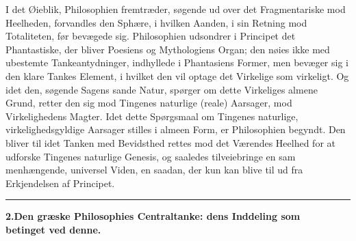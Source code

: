 \documentclass[12pt,a4paper]{book}
\newcommand{\divrule}{\begin{center}\rule{2cm}{0.4pt}\end{center}}
\newcommand{\dblrule}{\begin{center}%
  \rule{2cm}{0.4pt}\\[1.2pt]\rule{2cm}{0.4pt}\end{center}}
\begin{document}
I det Øieblik, Philosophien fremtræder, søgende ud over
det Fragmentariske mod Heelheden, forvandles den Sphære, i
hvilken Aanden, i sin Retning mod Totaliteten, før bevægede
sig. Philosophien udsondrer i Principet det Phantastiske, der
bliver Poesiens og Mythologiens Organ; den nøies ikke med
ubestemte Tankeantydninger, indhyllede i Phantasiens Former,
men bevæger sig i den klare Tankes Element, i hvilket den
vil optage det Virkelige som virkeligt. Og idet den, søgende
Sagens sande Natur, spørger om dette Virkeliges almene Grund,
retter den sig mod Tingenes naturlige (reale) Aarsager, mod
Virkelighedens Magter. Idet dette Spørgsmaal om Tingenes
naturlige, virkelighedsgyldige Aarsager stilles i almeen Form,
er Philosophien begyndt. Den bliver til idet Tanken med
Bevidsthed rettes mod det Værendes Heelhed for at udforske
Tingenes naturlige Genesis, og saaledes tilveiebringe en sam\-%
menhængende, universel Viden, en saadan, der kun kan blive
til ud fra Erkjendelsen af Principet.
\divrule
%
\begin{center}
\textbf{2.\enspace Den græske Philosophies Centraltanke: dens Inddeling som\\
betinget ved denne.}
\end{center}
\end{document}
